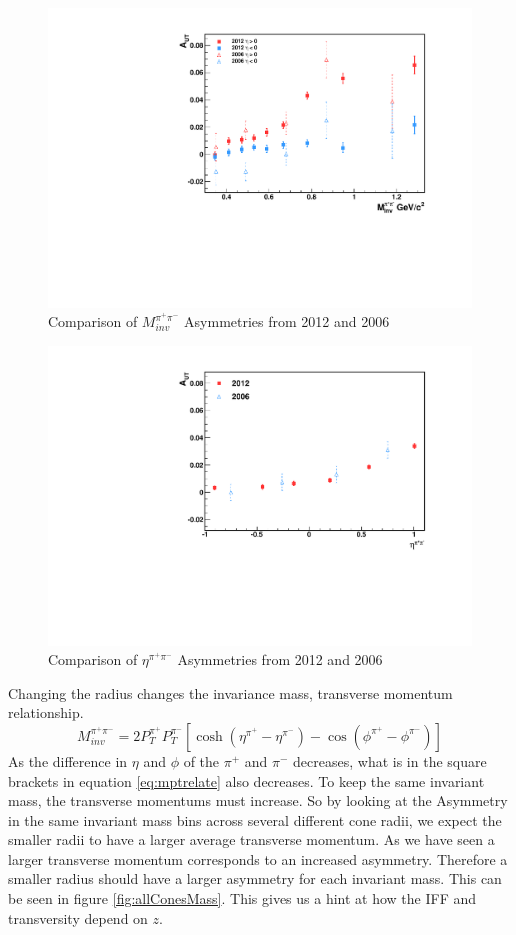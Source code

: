 \documentclass[abstract = on,listof=totoc, bibliography=totoc]{scrreprt}
\newcommand{\mpair}{M_{inv}^{\pi^+\pi^-}}
\newcommand{\etapair}{\eta^{\pi^+\pi^-}}
\newcommand{\pip}{\pi^+}
\newcommand{\pim}{\pi^-}
\begin{document}
\begin{figure}
\begin{center}
\includegraphics[width = .7\textwidth]{asymsHiLoAnselm_Mass_8_24_15}
\caption[$\mpair$ Asymmetries 2012 and 2006]{Comparison of $\mpair$ Asymmetries from 2012 and 2006}
\label{fig:compMass}
\end{center}
\end{figure}

\begin{figure}
\begin{center}
\includegraphics[width = .7\textwidth]{asymsHiLoAnselm_Eta_8_24_15}
\caption[$\etapair$ Asymmetries 2012 and 2006]{Comparison of $\etapair$ Asymmetries from 2012 and 2006}
\label{fig:compEta}
\end{center}
\end{figure}

Changing the radius changes the invariance mass, transverse momentum relationship. 
\begin{equation}
\label{eq:mptrelate}
\mpair = 2P_T^{\pi^+}P_T^{\pi^-}\left[\cosh \left(\eta^{\pi^+}-\eta^{\pi^-}\right) - \cos \left(\phi^{\pi^+}-\phi^{\pi^-}\right)\right]
\end{equation}
%
As the difference in $\eta$ and $\phi$ of the $\pip$ and $\pim$ decreases, what is in the square brackets in equation \ref{eq:mptrelate} also decreases. To keep the same invariant mass, the transverse momentums must increase. So by looking at the Asymmetry in the same invariant mass bins across several different cone radii, we expect the smaller radii to have a larger average transverse momentum. As we have seen a larger transverse momentum corresponds to an increased asymmetry. Therefore a smaller radius should have a larger asymmetry for each invariant mass. This can be seen in figure \ref{fig:allConesMass}. This gives us a hint at how the IFF and transversity depend on $z$. 
\end{document}
